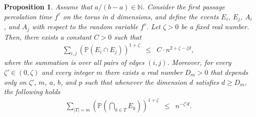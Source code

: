 \documentclass[reqno]{amsart}
\newtheorem{proposition}[theorem]{Proposition}
\begin{document}
\begin{proposition} Assume that $a/(b-a)\in\mathbb N$. Consider the first passage percolation time  $f^{\tau}$ on the torus in $d$ dimensions, and define the events $E_i$, $E_j$, $A_i$, and $A_j$ with respect to the random variable $f^{\tau}$. Let $\zeta>0$ be a fixed real number. Then, 
there exists a constant $C>0$ such that
\begin{eqnarray}
\sum_{i,j} \left(\mathbb P\left(E_i\cap E_j\right)\right)^{1+\zeta}&\leq& C\cdot n^{2+\zeta-\zeta d}, \label{eqn|L2D3}
\end{eqnarray}
where the summation is over all pairs of edges $(i,j)$. 
Moreover, for every $\zeta'\in(0,\zeta)$ and every integer $m$ there exists a real number $D_m>0$ that depends only on $\zeta'$, $m$, $a$, $b$, and $p$ such that whenever the dimension $d$ satisfies $d\geq D_m$, the following holds
\begin{eqnarray}
\sum_{|T|=m} \left(\mathbb P\left(\bigcap_{k\in T}E_k\right)\right)^{1+\zeta}&\leq& n^{-\zeta'd}. \label{eqn|L2Dm}
\end{eqnarray}
\end{proposition}
\end{document}
